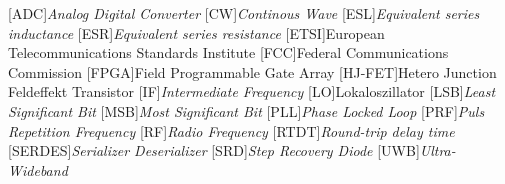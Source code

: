 \label{ch:symbole}

\opensymdef
{}
\closesymdef


\renewcommand{\symheadingname}{Symbolverzeichnis}
\listofsymbols



\label{ch:abkuerzungen}
 
\begin{acronym}[SEPSEP]
[ADC]{\textit{Analog Digital Converter}}
[CW]{\textit{Continous Wave}}
[ESL]{\textit{Equivalent series inductance}}
[ESR]{\textit{Equivalent series resistance}}
[ETSI]{European Telecommunications Standards Institute}
[FCC]{Federal Communications Commission}
[FPGA]{Field Programmable Gate Array}
[HJ-FET]{Hetero Junction Feldeffekt Transistor}
[IF]{\textit{Intermediate Frequency}}
[LO]{Lokaloszillator}
[LSB]{\textit{Least Significant Bit}}
[MSB]{\textit{Most Significant Bit}}
[PLL]{\textit{Phase Locked Loop}}
[PRF]{\textit{Puls Repetition Frequency}}
[RF]{\textit{Radio Frequency}}
[RTDT]{\textit{Round-trip delay time}}
[SERDES]{\textit{Serializer Deserializer}}
[SRD]{\textit{Step Recovery Diode}}
[UWB]{\textit{Ultra-Wideband}}
\end{acronym}